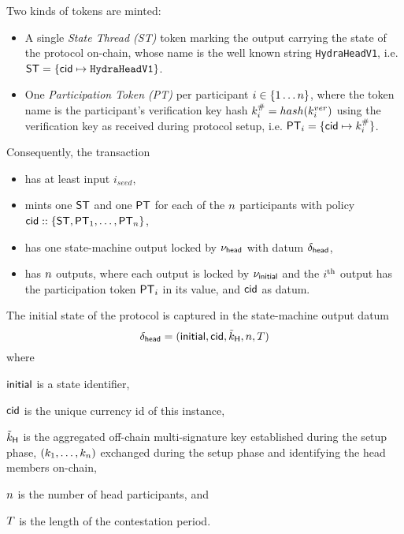 \vspace{0.1cm}
\noindent Two kinds of tokens are minted:
\begin{itemize}
  \item A single \emph{State Thread (ST)} token marking the output carrying the state
        of the protocol on-chain, whose name is the well known string
        \texttt{HydraHeadV1}, i.e.
        $\mathsf{ST} = \{\mathsf{cid} \mapsto \texttt{HydraHeadV1}\}$.
  \item One \emph{Participation Token (PT)} per participant
        $i \in \{1 \dots n \}$, where the token name is the participant's
        verification key hash $k^{\#}_{i} = hash(k^{ver}_{i})$ using the
        verification key as received during protocol setup, i.e.
        $\mathsf{PT}_{i} = \{\mathsf{cid} \mapsto k^{\#}_{i}\}$.
\end{itemize}

\noindent Consequently, the \mtxInit{} transaction

\begin{itemize}
  \item has at least input $i_{seed}$,
  \item mints one $\mathsf{ST}$ and one $\mathsf{PT}$ for each of the $n$ participants with
        policy $\mathsf{cid} :: \{\mathsf{ST}, \mathsf{PT}_{1}, \ldots, \mathsf{PT}_{n}\}$,
  \item has one state-machine output locked by $\nu_\mathsf{head}$ with datum
        $\delta_{\mathsf{head}}$,
  \item has $n$ outputs, where each output is locked by $\nu_\mathsf{initial}$ and the
        $i^{\text{th}}$ output has the participation token $\mathsf{PT}_i$ in its value, and
        $\mathsf{cid}$ as datum.
\end{itemize}

\noindent The initial state of the protocol is captured in the state-machine output datum
\[
  \delta_{\mathsf{head}} = (\mathsf{initial},\mathsf{cid},\tilde{k}_{\mathsf{H}},n,T)
\]
where
\begin{mitemize}
  \item $\mathsf{initial}$ is a state identifier,
  \item $\mathsf{cid}$ is the unique currency id of this instance,
  \item $\tilde{k}_{\mathsf{H}}$ is the aggregated off-chain multi-signature key established during the
  setup phase,
  $(k_1,\ldots,k_n)$ exchanged during the setup phase and identifying the
  head members on-chain,
  \item $n$ is the number of head participants, and
  \item $T$ is the length of the contestation period.
\end{mitemize}

